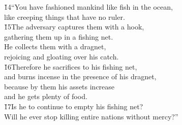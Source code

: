 \begin{poetry}
\poeml \v{14}``You have fashioned mankind like fish in the ocean, \\
\poemll    like creeping things that have no ruler. \\
\poeml \v{15}The adversary captures them with a hook, \\
\poemll    gathering them up in a fishing net. \\
\poeml He collects them with a dragnet, \\
\poemll    rejoicing and gloating over his catch. \\
\poeml \v{16}Therefore he sacrifices to his fishing net, \\
\poemll    and burns incense in the presence of his dragnet, \\
\poeml because by them his assets increase \\
\poemll    and he gets plenty of food. \\
\poeml \v{17}Is he to continue to empty his fishing net? \\
\poemll    Will he ever stop killing entire nations without mercy?''
\end{poetry}

